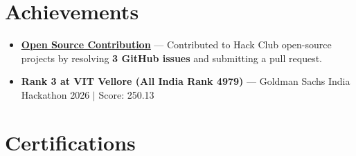 \documentclass[a4paper,10pt]{article}
\newcommand{\ulink}[2]{\href{#1}{\uline{#2}}}
\begin{document}
\vspace{2pt}

\section{Achievements}
\vspace{2pt}
\begin{itemize}[nosep, leftmargin=1.5em, itemsep=1pt, topsep=2pt]
  \item {\color[HTML]{0A0A0A}\fontsize{11}{14}\selectfont \ulink{https://github.com/hackclub/stardance/graphs/contributors?all=1}{\textbf{Open Source Contribution}} --- Contributed to Hack Club open-source projects by resolving \textbf{3 GitHub issues} and submitting a pull request.}
  \item {\color[HTML]{0A0A0A}\fontsize{11}{14}\selectfont \textbf{Rank 3 at VIT Vellore (All India Rank 4979)} --- Goldman Sachs India Hackathon 2026 $|$ Score: 250.13}
\end{itemize}

\vspace{2pt}

\section{Certifications}
\vspace{2pt}
\end{document}
